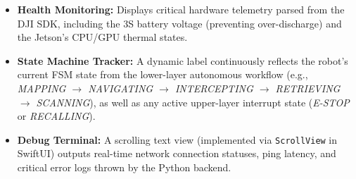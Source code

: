 \begin{itemize}
  \item \textbf{Health Monitoring:} Displays critical hardware telemetry parsed from the DJI SDK, including the 3S battery voltage (preventing over-discharge) and the Jetson's CPU/GPU thermal states.

  \item \textbf{State Machine Tracker:} A dynamic label continuously reflects the robot's current FSM state from the lower-layer autonomous workflow (e.g., \textit{MAPPING $\rightarrow$ NAVIGATING $\rightarrow$ INTERCEPTING $\rightarrow$ RETRIEVING $\rightarrow$ SCANNING}), as well as any active upper-layer interrupt state (\textit{E-STOP} or \textit{RECALLING}).

  \item \textbf{Debug Terminal:} A scrolling text view (implemented via \texttt{ScrollView} in SwiftUI) outputs real-time network connection statuses, ping latency, and critical error logs thrown by the Python backend.
\end{itemize}